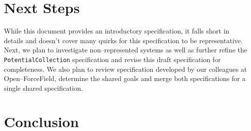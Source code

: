 \documentclass[12pt]{article}
\begin{document}
\section{Next Steps}
While this document provides an introductory specification, it falls short in details and doesn't cover many quirks for this specification to be representative. Next, we plan to investigate non--represented systems as well as further refine the \texttt{PotentialCollection} specification and revise this draft specification for completeness. We also plan to review specification developed by our colleagues at Open--ForceField, determine the shared goals and merge both specifications for a single shared specification.

\section{Conclusion}
\end{document}

